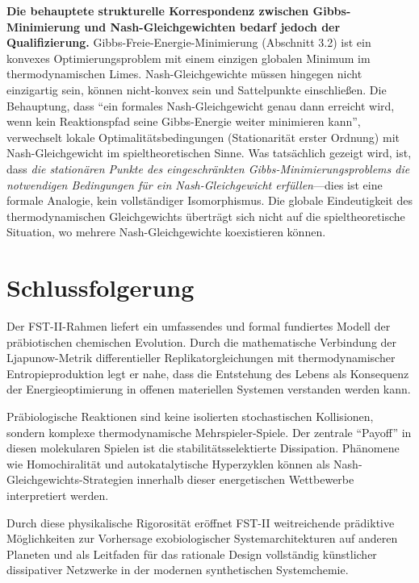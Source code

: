 \documentclass[12pt,a4paper]{article}
\theoremstyle{remark}
\begin{document}
\textbf{Die behauptete strukturelle Korrespondenz zwischen Gibbs-Minimierung und Nash-Gleichgewichten bedarf jedoch der Qualifizierung.} Gibbs-Freie-Energie-Minimierung (Abschnitt 3.2) ist ein konvexes Optimierungsproblem mit einem einzigen globalen Minimum im thermodynamischen Limes. Nash-Gleichgewichte m\"ussen hingegen nicht einzigartig sein, k\"onnen nicht-konvex sein und Sattelpunkte einschlie\ss{}en. Die Behauptung, dass ``ein formales Nash-Gleichgewicht genau dann erreicht wird, wenn kein Reaktionspfad seine Gibbs-Energie weiter minimieren kann'', verwechselt lokale Optimalit\"atsbedingungen (Stationarit\"at erster Ordnung) mit Nash-Gleichgewicht im spieltheoretischen Sinne. Was tats\"achlich gezeigt wird, ist, dass \emph{die station\"aren Punkte des eingeschr\"ankten Gibbs-Minimierungsproblems die notwendigen Bedingungen f\"ur ein Nash-Gleichgewicht erf\"ullen}---dies ist eine formale Analogie, kein vollst\"andiger Isomorphismus. Die globale Eindeutigkeit des thermodynamischen Gleichgewichts \"ubertr\"agt sich nicht auf die spieltheoretische Situation, wo mehrere Nash-Gleichgewichte koexistieren k\"onnen.

\section{Schlussfolgerung}
\label{sec:conclusion}

Der FST-II-Rahmen liefert ein umfassendes und formal fundiertes Modell der pr\"abiotischen chemischen Evolution. Durch die mathematische Verbindung der Ljapunow-Metrik differentieller Replikatorgleichungen mit thermodynamischer Entropieproduktion \citep{ReplicatorEntropy} legt er nahe, dass die Entstehung des Lebens als Konsequenz der Energieoptimierung in offenen materiellen Systemen verstanden werden kann.

Pr\"abiologische Reaktionen sind keine isolierten stochastischen Kollisionen, sondern komplexe thermodynamische Mehrspieler-Spiele. Der zentrale ``Payoff'' in diesen molekularen Spielen ist die stabilit\"atsselektierte Dissipation. Ph\"anomene wie Homochiralit\"at und autokatalytische Hyperzyklen k\"onnen als Nash-Gleichgewichts-Strategien innerhalb dieser energetischen Wettbewerbe interpretiert werden.

Durch diese physikalische Rigorosit\"at er\"offnet FST-II weitreichende pr\"adiktive M\"oglichkeiten zur Vorhersage exobiologischer Systemarchitekturen auf anderen Planeten und als Leitfaden f\"ur das rationale Design vollst\"andig k\"unstlicher dissipativer Netzwerke in der modernen synthetischen Systemchemie.
\end{document}
